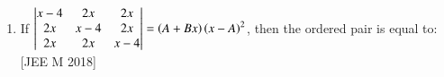 \documentclass[journal,,12pt,twocolumn]{IEEEtran}
\theoremstyle{remark}
\begin{document}
\begin{enumerate}
\begin{enumerate}
\end{enumerate} 
\item If $\begin{vmatrix}
x-4 & 2x  & 2x\\
2x & x-4 & 2x \\
 2x & 2x & x-4 
\end{vmatrix} =\left(A+Bx\right)\left(x-A\right)^2$, then the ordered pair  is equal to: 
\hfill{[JEE M 2018]}
\begin{enumerate}
\end{enumerate}
\end{enumerate}
\end{document}
